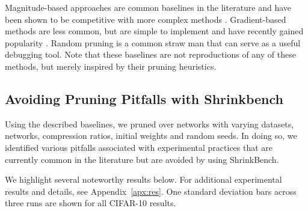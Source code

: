 Magnitude-based approaches are common baselines in the literature and have been shown to be competitive with more complex methods \cite{learning-both, han-prune-quant-huff, google-state-of-sparsity, lottery-ticket-followup}. Gradient-based methods are less common, but are simple to implement and have recently gained popularity \cite{snip, snip-followup, nisp}. Random pruning is a common straw man that can serve as a useful debugging tool. Note that these baselines are not reproductions of any of these methods, but merely inspired by their pruning heuristics.

\subsection{Avoiding Pruning Pitfalls with Shrinkbench}

Using the described baselines, we pruned over \NEXP{} networks with varying datasets, networks, compression ratios, initial weights and random seeds.
%
In doing so, we identified various pitfalls associated with experimental practices that are currently common in the literature but are avoided by using ShrinkBench.

We highlight several noteworthy results below. For additional experimental results and details, see Appendix~\ref{apx:res}.  One standard deviation bars across three runs are shown for all CIFAR-10 results.

\vspace{-2mm}
